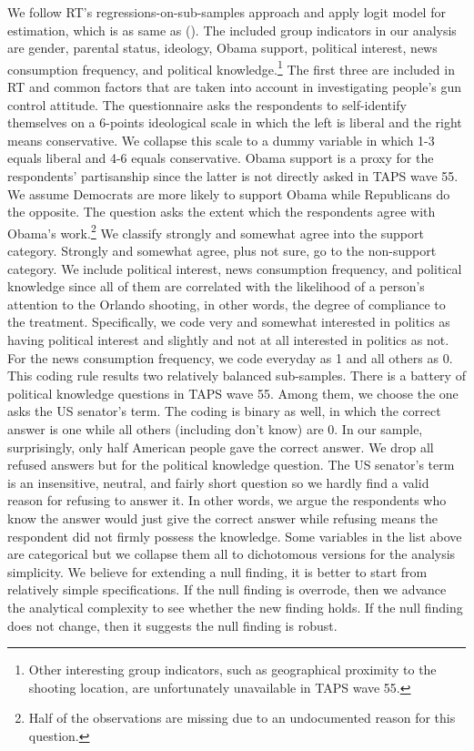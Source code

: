 \documentclass[11pt]{article}
\begin{document}
We follow RT’s regressions-on-sub-samples approach and apply logit model for estimation, which is as same as (). The included group indicators in our analysis are gender, parental status, ideology, Obama support, political interest, news consumption frequency, and political knowledge.\footnote{Other interesting group indicators, such as geographical proximity to the shooting location, are unfortunately unavailable in TAPS wave 55.} The first three are included in RT and common factors that are taken into account in investigating people’s gun control attitude. The questionnaire asks the respondents to self-identify themselves on a 6-points ideological scale in which the left is liberal and the right means conservative. We collapse this scale to a dummy variable in which 1-3 equals liberal and 4-6 equals conservative. Obama support is a proxy for the respondents’ partisanship since the latter is not directly asked in TAPS wave 55. We assume Democrats are more likely to support Obama while Republicans do the opposite. The question asks the extent which the respondents agree with Obama’s work.\footnote{Half of the observations are missing due to an undocumented reason for this question.} We classify strongly and somewhat agree into the support category. Strongly and somewhat agree, plus not sure, go to the non-support category. We include political interest, news consumption frequency, and political knowledge since all of them are correlated with the likelihood of a person’s attention to the Orlando shooting, in other words, the degree of compliance to the treatment. Specifically, we code very and somewhat interested in politics as having political interest and slightly and not at all interested in politics as not. For the news consumption frequency, we code everyday as 1 and all others as 0. This coding rule results two relatively balanced sub-samples. There is a battery of political knowledge questions in TAPS wave 55. Among them, we choose the one asks the US senator’s term. The coding is binary as well, in which the correct answer is one while all others (including don’t know) are 0. In our sample, surprisingly, only half American people gave the correct answer. We drop all refused answers but for the political knowledge question. The US senator’s term is an insensitive, neutral, and fairly short question so we hardly find a valid reason for refusing to answer it. In other words, we argue the respondents who know the answer would just give the correct answer while refusing means the respondent did not firmly possess the knowledge. Some variables in the list above are categorical but we collapse them all to dichotomous versions for the analysis simplicity. We believe for extending a null finding, it is better to start from relatively simple specifications. If the null finding is overrode, then we advance the analytical complexity to see whether the new finding holds. If the null finding does not change, then it suggests the null finding is robust.
\end{document}
